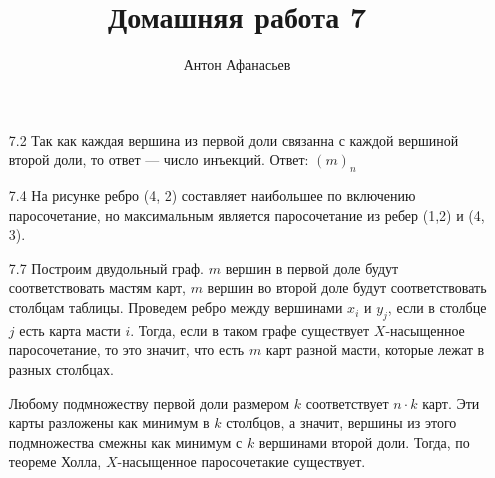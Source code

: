 \documentclass[10pt]{article}
\begin{document}
\title{Домашняя работа 7}
\author{Антон Афанасьев}
\maketitle

\begin{enumerate}
\item[7.2] Так как каждая вершина из первой доли связанна с каждой вершиной второй доли, то ответ --- число инъекций. Ответ: $(m)_n$ 

\item[7.4] На рисунке ребро (4, 2) составляет наибольшее по включению паросочетание, но максимальным является паросочетание из ребер (1,2) и (4, 3).


\item[7.7] Построим двудольный граф. $m$ вершин в первой доле будут соответствовать мастям карт, $m$ вершин во второй доле будут соответствовать столбцам таблицы. Проведем ребро между вершинами $x_i$ и $y_j$,  если в столбце $j$ есть карта масти $i$. Тогда, если в таком графе существует $X$-насыщенное паросочетание, то это значит, что есть $m$ карт разной масти, которые лежат в разных столбцах.

Любому подмножеству первой доли размером $k$ соответствует $n \cdot k$ карт. Эти карты разложены как минимум в $k$ столбцов, а значит, вершины из этого подмножества смежны как минимум с $k$ вершинами второй доли. Тогда, по теореме Холла, $X$-насыщенное паросочетакие существует.

\end{enumerate}
\end{document}
